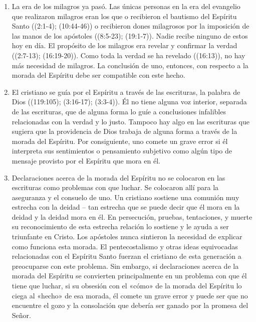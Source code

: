 \documentclass[12pt, twoside, openright]{book}
\begin{document}
\begin{enumerate}
\item La era de los milagros ya pasó. Las únicas personas en la era del evangelio que realizaron milagros eran los que o recibieron el bautismo del Espíritu Santo ((2:1-4); (10:44-46)) o recibieron dones milagrosos por la imposición de las manos de los apóstoles ((8:5-23); (19:1-7)).  Nadie recibe ninguno de estos hoy en día. El propósito de los milagros era revelar y confirmar la verdad ((2:7-13); (16:19-20)). Como toda la verdad se ha revelado ((16:13)), no hay más necesidad de milagros. La conclusión de uno, entonces, con respecto a la morada del Espíritu debe ser compatible con este hecho.
\item El cristiano se guía por el Espíritu a través de las escrituras, la palabra de Dios ((119:105); (3:16-17); (3:3-4)). Él no tiene alguna voz interior, separada de las escrituras, que de alguna forma lo guíe a conclusiones infalibles relacionadas con la verdad y lo justo. Tampoco hay algo en las escrituras que sugiera que la providencia de Dios trabaja de alguna forma a través de la morada del Espíritu. Por consiguiente, uno comete un grave error si él interpreta sus sentimientos o pensamiento subjetivo como algún tipo de mensaje provisto por el Espíritu que mora en él.
\item Declaraciones acerca de la morada del Espíritu no se colocaron en las escrituras como problemas con que luchar. Se colocaron allí para la aseguranza y el consuelo de uno. Un cristiano sostiene una comunión muy estrecha con la deidad – tan estrecha que se puede decir que él mora en la deidad y la deidad mora en él. En persecución, pruebas, tentaciones, y muerte su reconocimiento de esta estrecha relación lo sostiene y le ayuda a ser triunfante en Cristo. Los apóstoles nunca sintieron la necesidad de explicar como funciona esta morada. El pentecostalismo y otras ideas equivocadas relacionadas con el Espíritu Santo fuerzan el cristiano de esta generación a preocuparse con este problema. Sin embargo, si declaraciones acerca de la morada del Espíritu se convierten principalmente en un problema con que él tiene que luchar, si su obsesión con el «cómo» de la morada del Espíritu lo ciega al «hecho» de esa morada, él comete un grave error y puede ser que no encuentre el gozo y la consolación que debería ser ganado por la promesa del Señor.
\end{enumerate}
\end{document}
